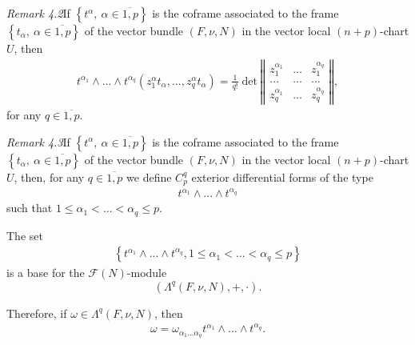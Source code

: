 \documentclass[11pt]{article}
\begin{document}
\emph{Remark 4.2}If $\left\{ t^{\alpha },~\alpha \in \overline{1,p}\right\} $
is the coframe associated to the frame $\left\{ t_{\alpha },~\alpha \in
\overline{1,p}\right\} $ of the vector bundle $\left( F,\nu ,N\right) $ in
the vector local $\left( n+p\right) $-chart $U$, then
\begin{equation*}
\begin{array}{c}
t^{\alpha _{1}}\wedge ...\wedge t^{\alpha _{q}}\left( z_{1}^{\alpha
}t_{\alpha },...,z_{q}^{\alpha }t_{\alpha }\right) =\frac{1}{q!}\det
\left\Vert
\begin{array}{ccc}
z_{1}^{\alpha _{1}} & ... & z_{1}^{\alpha _{q}} \\
... & ... & ... \\
z_{q}^{\alpha _{1}} & ... & z_{q}^{\alpha _{q}}%
\end{array}%
\right\Vert ,%
\end{array}%
\end{equation*}%
for any $q\in \overline{1,p}.$

\emph{Remark 4.3}If $\left\{ t^{\alpha },~\alpha \in \overline{1,p}\right\} $
is the coframe associated to the frame $\left\{ t_{\alpha },~\alpha \in
\overline{1,p}\right\} $ of the vector bundle $\left( F,\nu ,N\right) $ in
the vector local $\left( n+p\right) $-chart $U$, then, for any $q\in
\overline{1,p}$ we define $C_{p}^{q}$ exterior differential forms of the
type
\begin{equation*}
\begin{array}{c}
t^{\alpha _{1}}\wedge ...\wedge t^{\alpha _{q}}%
\end{array}%
\end{equation*}%
such that $1\leq \alpha _{1}<...<\alpha _{q}\leq p.$

The set%
\begin{equation*}
\begin{array}{c}
\left\{ t^{\alpha _{1}}\wedge ...\wedge t^{\alpha _{q}},1\leq \alpha
_{1}<...<\alpha _{q}\leq p\right\}%
\end{array}%
\end{equation*}%
is a base for the $\mathcal{F}\left( N\right) $-module
\begin{equation*}
\left( \Lambda ^{q}\left( F,\nu ,N\right) ,+,\cdot \right) .
\end{equation*}

Therefore, if $\omega \in \Lambda ^{q}\left( F,\nu ,N\right) $, then%
\begin{equation*}
\begin{array}{c}
\omega =\omega _{\alpha _{1}...\alpha _{q}}t^{\alpha _{1}}\wedge ...\wedge
t^{\alpha _{q}}.%
\end{array}%
\end{equation*}
\end{document}
